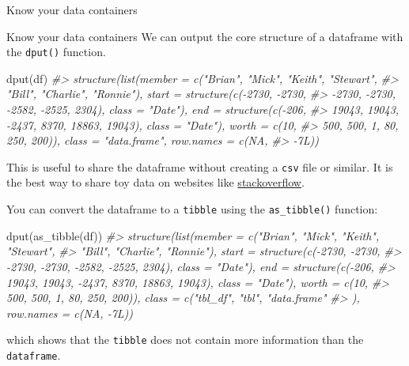 \documentclass[
  11pt,
  ignorenonframetext,
  svgnames, handout, t]{beamer}
\newenvironment{Shaded}{\begin{snugshade}}{\end{snugshade}}
\newcommand{\CommentTok}[1]{\textcolor[rgb]{0.56,0.35,0.01}{\textit{#1}}}
\newcommand{\FunctionTok}[1]{\textcolor[rgb]{0.00,0.00,0.00}{#1}}
\newcommand{\NormalTok}[1]{#1}
\newcommand{\OtherTok}[1]{\textcolor[rgb]{0.56,0.35,0.01}{#1}}
\newcommand{\SpecialCharTok}[1]{\textcolor[rgb]{0.00,0.00,0.00}{#1}}
\newcommand{\StringTok}[1]{\textcolor[rgb]{0.31,0.60,0.02}{#1}}
\begin{document}
\begin{frame}[fragile]{Know your data containers}
\begin{Shaded}
\end{Shaded}

\normalsize
\end{frame}

\begin{frame}[fragile]{Know your data containers}
\protect\hypertarget{know-your-data-containers-3}{}
We can output the core structure of a dataframe with the \texttt{dput()}
function.

\footnotesize

\begin{Shaded}
\begin{Highlighting}[]
\FunctionTok{dput}\NormalTok{(df)}
\CommentTok{\#\textgreater{} structure(list(member = c("Brian", "Mick", "Keith", "Stewart", }
\CommentTok{\#\textgreater{} "Bill", "Charlie", "Ronnie"), start = structure(c({-}2730, {-}2730, }
\CommentTok{\#\textgreater{} {-}2730, {-}2730, {-}2582, {-}2525, 2304), class = "Date"), end = structure(c({-}206, }
\CommentTok{\#\textgreater{} 19043, 19043, {-}2437, 8370, 18863, 19043), class = "Date"), worth = c(10, }
\CommentTok{\#\textgreater{} 500, 500, 1, 80, 250, 200)), class = "data.frame", row.names = c(NA, }
\CommentTok{\#\textgreater{} {-}7L))}
\end{Highlighting}
\end{Shaded}

\normalsize This is useful to share the dataframe without creating a
\texttt{csv} file or similar. It is the best way to share toy data on
websites like \href{https://stackoverflow.com/}{stackoverflow}.

You can convert the dataframe to a \texttt{tibble} using the
\texttt{as\_tibble()} function:

\footnotesize

\begin{Shaded}
\begin{Highlighting}[]
\FunctionTok{dput}\NormalTok{(}\FunctionTok{as\_tibble}\NormalTok{(df))}
\CommentTok{\#\textgreater{} structure(list(member = c("Brian", "Mick", "Keith", "Stewart", }
\CommentTok{\#\textgreater{} "Bill", "Charlie", "Ronnie"), start = structure(c({-}2730, {-}2730, }
\CommentTok{\#\textgreater{} {-}2730, {-}2730, {-}2582, {-}2525, 2304), class = "Date"), end = structure(c({-}206, }
\CommentTok{\#\textgreater{} 19043, 19043, {-}2437, 8370, 18863, 19043), class = "Date"), worth = c(10, }
\CommentTok{\#\textgreater{} 500, 500, 1, 80, 250, 200)), class = c("tbl\_df", "tbl", "data.frame"}
\CommentTok{\#\textgreater{} ), row.names = c(NA, {-}7L))}
\end{Highlighting}
\end{Shaded}

\normalsize which shows that the \texttt{tibble} does not contain more
information than the \texttt{dataframe}.
\end{frame}
\end{document}
